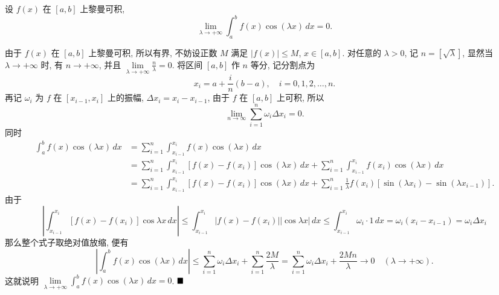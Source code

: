 \documentclass[lang=cn,newtx,10pt,scheme=chinese]{elegantbook}
\begin{document}
\begin{lemma}
设 $f(x)$ 在 $[a, b]$ 上黎曼可积, 
$$\lim\limits_{\lambda \to +\infty} \int_{a}^{b} f(x) \cos(\lambda x) \,dx = 0.$$
\end{lemma}
\begin{solution}
由于 $f(x)$ 在 $[a, b]$ 上黎曼可积, 所以有界, 不妨设正数 $M$ 满足 $|f(x)| \leq M$, $x \in [a, b]$. 对任意的 $\lambda > 0$, 记 $n = [\sqrt{\lambda}]$, 显然当 $\lambda \to +\infty$ 时, 有 $n \to +\infty$, 并且 $\lim\limits_{\lambda \to +\infty} \frac{n}{\lambda} = 0$. 将区间 $[a, b]$ 作 $n$ 等分, 记分割点为
$$x_i = a + \frac{i}{n}(b-a), \quad i = 0, 1, 2, \dots, n.$$
再记 $\omega_i$ 为 $f$ 在 $[x_{i-1}, x_i]$ 上的振幅, $\Delta x_i = x_i - x_{i-1}$, 由于 $f$ 在 $[a, b]$ 上可积, 所以
$$\lim\limits_{n \to \infty} \sum_{i=1}^{n} \omega_i \Delta x_i = 0.$$
同时
\begin{align*} \int_{a}^{b} f(x) \cos(\lambda x) \,dx &= \sum_{i=1}^{n} \int_{x_{i-1}}^{x_i} f(x) \cos(\lambda x) \,dx \\ &= \sum_{i=1}^{n} \int_{x_{i-1}}^{x_i} [f(x) - f(x_i)] \cos(\lambda x) \,dx + \sum_{i=1}^{n} \int_{x_{i-1}}^{x_i} f(x_i) \cos(\lambda x) \,dx \\ &= \sum_{i=1}^{n} \int_{x_{i-1}}^{x_i} [f(x) - f(x_i)] \cos(\lambda x) \,dx + \sum_{i=1}^{n} \frac{1}{\lambda} f(x_i) [\sin(\lambda x_i) - \sin(\lambda x_{i-1})]. \end{align*}
由于
$$\left| \int_{x_{i-1}}^{x_i} [f(x) - f(x_i)] \cos \lambda x \,dx \right| \leq \int_{x_{i-1}}^{x_i} |f(x) - f(x_i)| |\cos \lambda x| \,dx \leq \int_{x_{i-1}}^{x_i} \omega_i \cdot 1 \,dx = \omega_i (x_i - x_{i-1}) = \omega_i \Delta x_i$$
那么整个式子取绝对值放缩, 便有
$$\left| \int_{a}^{b} f(x) \cos(\lambda x) \,dx \right| \leq \sum_{i=1}^{n} \omega_i \Delta x_i + \sum_{i=1}^{n} \frac{2M}{\lambda} = \sum_{i=1}^{n} \omega_i \Delta x_i + \frac{2Mn}{\lambda} \to 0 \quad (\lambda \to +\infty).$$
这就说明 $\lim\limits_{\lambda \to +\infty} \int_{a}^{b} f(x) \cos(\lambda x) \,dx = 0$.
$\hfill \blacksquare$
\end{solution}
\end{document}
